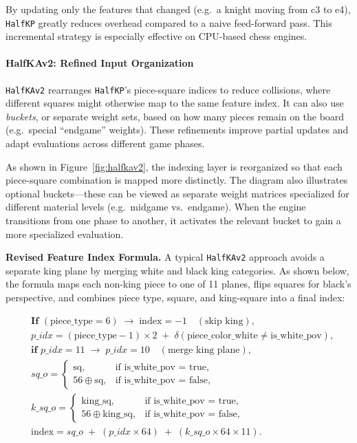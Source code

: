\documentclass[12pt,a4paper]{article}
\begin{document}
\medskip

By updating only the features that changed (e.g.\ a knight moving from c3 to e4), \texttt{HalfKP} greatly reduces overhead compared to a naive feed-forward pass. This incremental strategy is especially effective on CPU-based chess engines.


\paragraph{HalfKAv2: Refined Input Organization}
\label{sec:halfkav2}

\texttt{HalfKAv2} rearranges \texttt{HalfKP}’s piece-square indices to reduce collisions, where different squares might otherwise map to the same feature index. It can also use \emph{buckets}, or separate weight sets, based on how many pieces remain on the board (e.g.\ special “endgame” weights). These refinements improve partial updates and adapt evaluations across different game phases.

As shown in Figure~\ref{fig:halfkav2}, the indexing layer is reorganized so that each piece-square combination is mapped more distinctly. The diagram also illustrates optional buckets—these can be viewed as separate weight matrices specialized for different material levels (e.g.\ midgame vs.\ endgame). When the engine transitions from one phase to another, it activates the relevant bucket to gain a more specialized evaluation.

\medskip

\noindent
\textbf{Revised Feature Index Formula.}
A typical \texttt{HalfKAv2} approach avoids a separate king plane by merging white and black king categories. 
As shown below, the formula maps each non-king piece to one of 11 planes, flips squares for black’s perspective, 
and combines piece type, square, and king-square into a final index:

\[
\begin{aligned}
&\textbf{If } (\text{piece\_type} = 6) \;\rightarrow\; \text{index} = -1 \quad(\text{skip king}),\\
&p\_idx 
= (\text{piece\_type}-1)\times 2 
  \;+\; 
  \delta(\text{piece\_color\_white} \neq \text{is\_white\_pov}),\\
&\textbf{if } p\_idx=11 
  \;\rightarrow\; 
  p\_idx=10 \quad(\text{merge king plane}),\\
&sq\_o =
\begin{cases}
\text{sq}, & \text{if is\_white\_pov = true},\\
56 \oplus \text{sq}, & \text{if is\_white\_pov = false},
\end{cases}\\
&k\_sq\_o =
\begin{cases}
\text{king\_sq}, & \text{if is\_white\_pov = true},\\
56 \oplus \text{king\_sq}, & \text{if is\_white\_pov = false},
\end{cases}\\
&\text{index} 
= sq\_o 
  \;+\;
  (p\_idx \times 64)
  \;+\;
  (k\_sq\_o \times 64 \times 11).
\end{aligned}
\]
\end{document}
